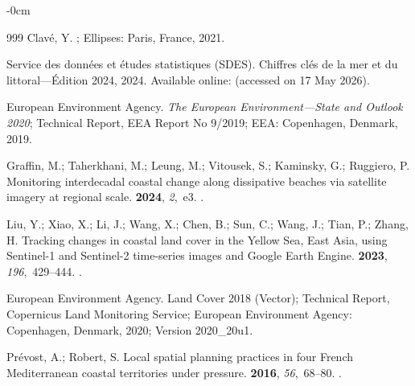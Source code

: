 \documentclass[coasts,article,accept,pdftex,moreauthors]{Definitions/mdpi}
\begin{document}
\begin{adjustwidth}{-\extralength}{0cm}
\begin{thebibliography}{999}
Clav{\'e}, Y.
; Ellipses: Paris, France, 2021.

{Service des donn{\'e}es et {\'e}tudes statistiques (SDES)}.
\newblock Chiffres cl{\'e}s de la mer et du littoral---{\'E}dition 2024,
  2024. Available online: %
 (accessed on 17 May 2026).


{European Environment Agency}.
\newblock \textit{The {European} Environment---State and Outlook 2020};
\newblock Technical Report, EEA Report No 9/2019; EEA: Copenhagen, Denmark, 2019.


Graffin, M.; Taherkhani, M.; Leung, M.; Vitousek, S.; Kaminsky, G.; Ruggiero,
  P.
\newblock Monitoring interdecadal coastal change along dissipative beaches via
  satellite imagery at regional scale.
 {\bf 2024}, {\em 2},~e3.
.

Liu, Y.; Xiao, X.; Li, J.; Wang, X.; Chen, B.; Sun, C.; Wang, J.; Tian, P.;
  Zhang, H.
\newblock Tracking changes in coastal land cover in the {Yellow Sea}, {East
  Asia}, using {Sentinel-1} and {Sentinel-2} time-series images and {Google
  Earth Engine}.
 {\bf 2023},
  {\em 196},~429--444.
.

{European Environment Agency}.
 Land Cover 2018 (Vector);
\newblock Technical Report, Copernicus Land Monitoring Service;  European Environment Agency: Copenhagen, Denmark, %
 2020;
\newblock Version 2020\_20u1.

Pr{\'e}vost, A.; Robert, S.
\newblock Local spatial planning practices in four {French} {Mediterranean}
  coastal territories under pressure.
 {\bf 2016}, {\em 56},~68--80.
.


\end{thebibliography}
\end{adjustwidth}
\end{document}
